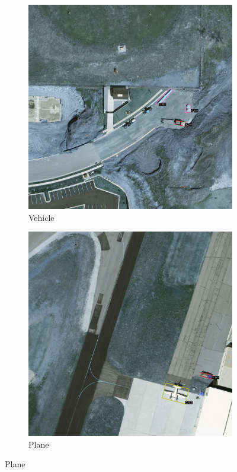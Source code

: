 \begin{figure}[h!]
    \begin{subfigure}[t]{0.38\textwidth}
        \centering
        \includegraphics[width=\linewidth]{images/015Results/02perm_exp/comp_images/rgbir/427.png}
        \caption{Vehicle}
    \end{subfigure}
    \begin{subfigure}[t]{0.38\textwidth}
        \centering
        \includegraphics[width=\linewidth]{images/015Results/02perm_exp/comp_images/rgbir/487.png}
        \caption{Plane}
    \end{subfigure}
    

\end{figure}
